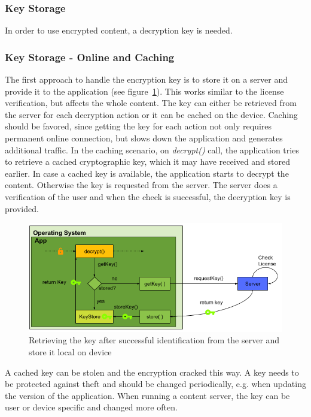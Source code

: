 \subsubsection{Key Storage} \label{section:counter-replace-encryption-key}
In order to use encrypted content, a decryption key is needed.

\subsubsection{Key Storage - Online and Caching} \label{section:counter-replace-encryption-key-online}
The first approach to handle the encryption key is to store it on a server and provide it to the application (see figure~\ref{fig:encryptionKeyServer}).
This works similar to the license verification, but affects the whole content.
\newline
The key can either be retrieved from the server for each decryption action or it can be cached on the device.
Caching should be favored, since getting the key for each action not only requires permanent online connection, but slows down the application and generates additional traffic.
\newline
In the caching scenario, on \textit{decrypt()} call, the application tries to retrieve a cached cryptographic key, which it may have received and stored earlier.
In case a cached key is available, the application starts to decrypt the content.
Otherwise the key is requested from the server.
The server does a verification of the user and when the check is successful, the decryption key is provided.
\newline
\begin{figure}[h]
    \centering
    \includegraphics[width=1\textwidth]{data/encryptionKeyServer.png}
    \caption{Retrieving the key after successful identification from the server and store it local on device}
    \label{fig:encryptionKeyServer}
\end{figure}
\newline
A cached key can be stolen \cite{memoryDump} and the encryption cracked this way.
A key needs to be protected against theft and should be changed periodically, e.g. when updating the version of the application.
When running a content server, the key can be user or device specific and changed more often.

